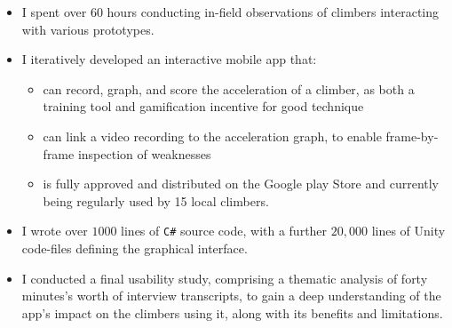 \noindent
\begin{itemize}
\item I spent over $60$ hours conducting in-field observations of climbers interacting with various prototypes.
\item I iteratively developed an interactive mobile app that: \begin{itemize}
      \item can record, graph, and score the acceleration of a climber, as both a training tool and gamification incentive for good technique
      \item can link a video recording to the acceleration graph, to enable frame-by-frame inspection of weaknesses
      \item is fully approved and distributed on the Google play Store and currently being regularly used by 15 local climbers.
\end{itemize}
\item I wrote over $1000$ lines of \verb|C#| source code, with a further $20,000$ lines of Unity code-files defining the graphical interface.
\item I conducted a final usability study, comprising a thematic analysis of forty minutes's worth of interview transcripts, to gain a deep understanding of the app's impact on the climbers using it, along with its benefits and limitations. 
\end{itemize}